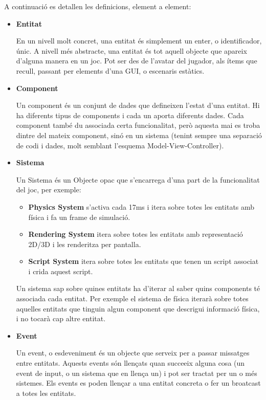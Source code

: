   A continuació es detallen les definicions, element a element:
  
  \begin{itemize}
    \item{\bf Entitat}

      En un nivell molt concret, una entitat és simplement un enter, o identificador, únic. A nivell més abstracte, una entitat és tot aquell objecte que apareix d'alguna manera en un joc. Pot ser des de l'avatar del jugador, als ítems que recull, passant per elements d'una GUI, o escenaris estàtics.

    \item{\bf Component}

      Un component és un conjunt de dades que defineixen l'estat d'una entitat. Hi ha diferents tipus de components i cada un aporta diferents dades. Cada component també du associada certa funcionalitat, però aquesta mai es troba dintre del mateix component, sinó en un sistema (tenint sempre una separació de codi i dades, molt semblant l'esquema Model-View-Controller).

    \item{\bf Sistema}

      Un Sistema és un Objecte opac que s'encarrega d'una part de la funcionalitat del joc, per exemple:
      \begin{itemize}
        \item{\bf Physics System} s'activa cada 17ms i itera sobre totes les entitats amb física i fa un frame de simulació.
        \item{\bf Rendering System} itera sobre totes les entitats amb representació 2D/3D i les renderitza per pantalla.
        \item{\bf Script System} itera sobre totes les entitats que tenen un script associat i crida aquest script.
      \end{itemize}

      Un sistema sap sobre quines entitats ha d'iterar al saber quins components té associada cada entitat. Per exemple el sistema de física iterarà sobre totes aquelles entitats que tinguin algun component que descrigui informació física, i no tocarà cap altre entitat.

    \item{\bf Event}

      Un event, o esdeveniment és un objecte que serveix per a passar missatges entre entitats. Aquests events són llençats quan succeeix alguna cosa (un event de input, o un sistema que en llença un) i pot ser tractat per un o més sistemes. Els events es poden llençar a una entitat concreta o fer un broatcast a totes les entitats.


\end{itemize}
